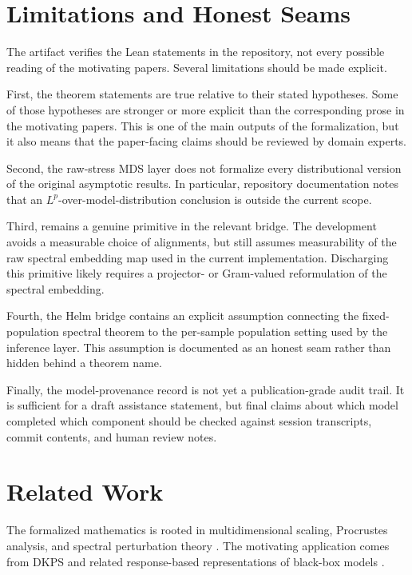 \documentclass[11pt]{article}
\newcommand{\decl}[1]{\path{#1}}
\begin{document}
\section{Limitations and Honest Seams}

The artifact verifies the Lean statements in the repository, not every possible
reading of the motivating papers.  Several limitations should be made explicit.

First, the theorem statements are true relative to their stated hypotheses.  Some
of those hypotheses are stronger or more explicit than the corresponding prose
in the motivating papers.  This is one of the main outputs of the formalization,
but it also means that the paper-facing claims should be reviewed by domain
experts.

Second, the raw-stress MDS layer does not formalize every distributional version
of the original asymptotic results.  In particular, repository documentation
notes that an \(L^p\)-over-model-distribution conclusion is outside the current
scope.

Third, \decl{hmeas_spec} remains a genuine primitive in the relevant bridge.
The development avoids a measurable choice of alignments, but still assumes
measurability of the raw spectral embedding map used in the current
implementation.  Discharging this primitive likely requires a projector- or
Gram-valued reformulation of the spectral embedding.

Fourth, the Helm bridge contains an explicit assumption connecting the
fixed-population spectral theorem to the per-sample population setting used by
the inference layer.  This assumption is documented as an honest seam rather
than hidden behind a theorem name.

Finally, the model-provenance record is not yet a publication-grade audit trail.
It is sufficient for a draft assistance statement, but final claims about which
model completed which component should be checked against session transcripts,
commit contents, and human review notes.

\section{Related Work}

The formalized mathematics is rooted in multidimensional scaling,
Procrustes analysis, and spectral perturbation theory
\cite{torgerson1952mds,gower1966distance,kruskal1964mds,goodall1991procrustes,davis1970rotation,yu2015davis,chen2021spectral}.
The motivating application comes from DKPS and related response-based
representations of black-box models
\cite{duderstadt2023datakernels,helm2024tracking,acharyya2024consistent,acharyya2025concentration,helm2025inference,helm2026query}.
\end{document}
